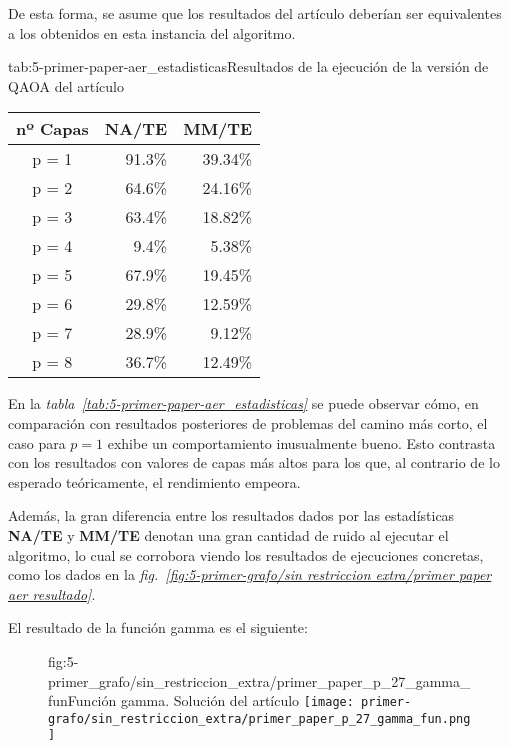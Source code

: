 De esta forma, se asume que los resultados del artículo deberían ser equivalentes a los obtenidos en esta instancia del algoritmo.

\begin{table}[Resultados QAOA {--} artículo de Urgelles et al. (2022) {--} solución del artículo]{tab:5-primer-paper-aer_estadisticas}{Resultados de la ejecución de la versión de QAOA del artículo\cite{multi-objective_routing_optimization}}
  \centering
  \begin{tabular}{|c|r|r|}
    \hline
    \textbf{nº Capas} & \textbf{NA/TE} & \textbf{MM/TE} \\ \hline
    p = 1 & 91.3\% & 39.34\% \\ \hline
    p = 2 & 64.6\% & 24.16\% \\ \hline
    p = 3 & 63.4\% & 18.82\% \\ \hline
    p = 4 &  9.4\% &  5.38\% \\ \hline
    p = 5 & 67.9\% & 19.45\% \\ \hline
    p = 6 & 29.8\% & 12.59\% \\ \hline
    p = 7 & 28.9\% &  9.12\% \\ \hline
    p = 8 & 36.7\% & 12.49\% \\ \hline
  \end{tabular}
\end{table}

En la \textit{tabla~\ref{tab:5-primer-paper-aer_estadisticas}} se puede observar cómo, en comparación con resultados posteriores de problemas del camino más corto, el caso para $p = 1$ exhibe un comportamiento inusualmente bueno.
Esto contrasta con los resultados con valores de capas más altos para los que, al contrario de lo esperado teóricamente, el rendimiento empeora.

Además, la gran diferencia entre los resultados dados por las estadísticas \textbf{NA/TE} y \textbf{MM/TE} denotan una gran cantidad de ruido al ejecutar el algoritmo, lo cual se corrobora viendo los resultados de ejecuciones concretas, como los dados en la \textit{fig.~\ref{fig:5-primer-grafo/sin restriccion extra/primer paper aer resultado}}.

El resultado de la función gamma es el siguiente:
\begin{figure}[Resultados QAOA {--} artículo de Urgelles et al. (2022) {--} función gamma de la solución del artículo]{fig:5-primer_grafo/sin_restriccion_extra/primer_paper_p_27_gamma_fun}{Función gamma. Solución del artículo\cite{multi-objective_routing_optimization}}
  \centering
  \texttt{[image: primer-grafo/sin\_restriccion\_extra/primer\_paper\_p\_27\_gamma\_fun.png]}
\end{figure}

